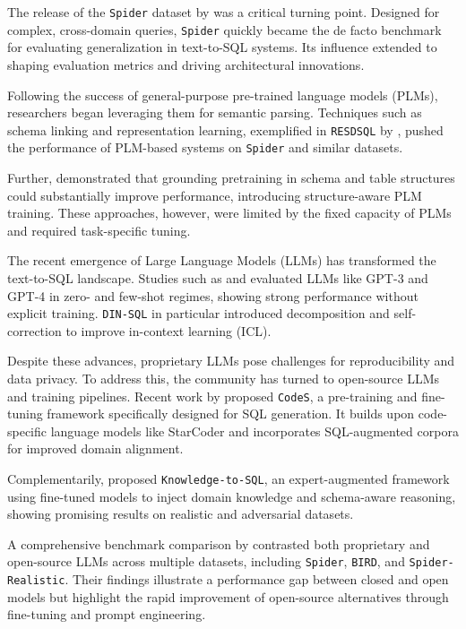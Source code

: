 The release of the \texttt{Spider} dataset by \citet{yu2018spider} was a critical turning point. Designed for complex, cross-domain queries, \texttt{Spider} quickly became the de facto benchmark for evaluating generalization in text-to-SQL systems. Its influence extended to shaping evaluation metrics and driving architectural innovations.

Following the success of general-purpose pre-trained language models (PLMs), researchers began leveraging them for semantic parsing. Techniques such as schema linking and representation learning, exemplified in \texttt{RESDSQL} by \citet{li2023resdsql}, pushed the performance of PLM-based systems on \texttt{Spider} and similar datasets.

Further, \citet{deng2021structure} demonstrated that grounding pretraining in schema and table structures could substantially improve performance, introducing structure-aware PLM training. These approaches, however, were limited by the fixed capacity of PLMs and required task-specific tuning.

The recent emergence of Large Language Models (LLMs) has transformed the text-to-SQL landscape. Studies such as \citet{rajkumar2022evaluating} and \citet{pourreza2023dinsql} evaluated LLMs like GPT-3 and GPT-4 in zero- and few-shot regimes, showing strong performance without explicit training. \texttt{DIN-SQL} in particular introduced decomposition and self-correction to improve in-context learning (ICL).

Despite these advances, proprietary LLMs pose challenges for reproducibility and data privacy. To address this, the community has turned to open-source LLMs and training pipelines. Recent work by \citet{li2024codes} proposed \texttt{CodeS}, a pre-training and fine-tuning framework specifically designed for SQL generation. It builds upon code-specific language models like StarCoder and incorporates SQL-augmented corpora for improved domain alignment.

Complementarily, \citet{hong2024knowledge} proposed \texttt{Knowledge-to-SQL}, an expert-augmented framework using fine-tuned models to inject domain knowledge and schema-aware reasoning, showing promising results on realistic and adversarial datasets.

A comprehensive benchmark comparison by \citet{gao2024benchmark} contrasted both proprietary and open-source LLMs across multiple datasets, including \texttt{Spider}, \texttt{BIRD}, and \texttt{Spider-Realistic}. Their findings illustrate a performance gap between closed and open models but highlight the rapid improvement of open-source alternatives through fine-tuning and prompt engineering.

